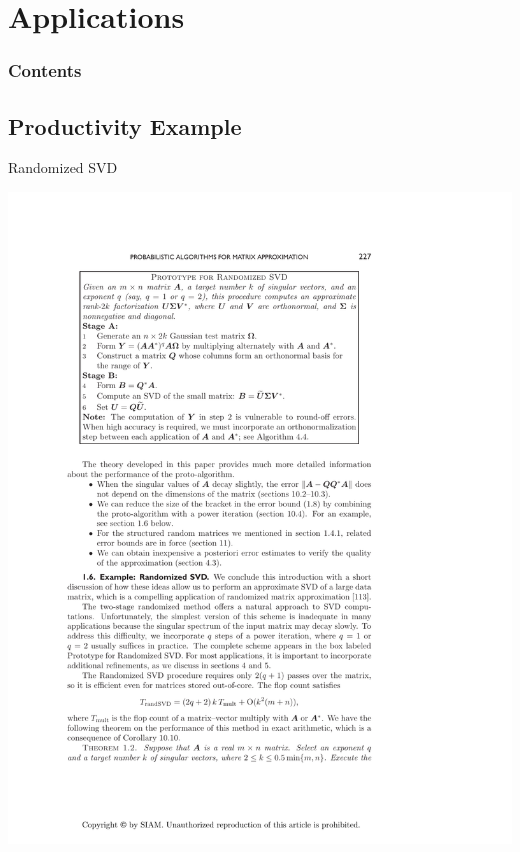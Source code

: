 \section{Applications}

\hidenum
\begin{frame}[noframenumbering]
\frametitle{Contents}
\end{frame}
\shownum

\subsection{Productivity Example}

\begin{frame}[fragile]
\fontsize{8pt}{10}\selectfont
\begin{block}{Randomized SVD\footnotemark}
  \begin{minipage}{.55\textwidth}
    \begin{center}
      \includegraphics[width=.95\textwidth]{../common/pics/randsvd/randSVDalg}
      \\

\end{center}
\end{minipage}
\end{block}
\end{frame}
